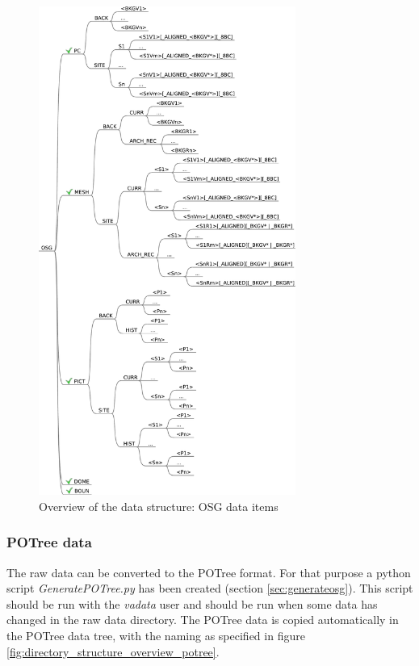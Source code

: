 \begin{figure}[!ht]
 \centering
 \includegraphics[width=0.75\textwidth]{fig/directory_structure_osg}
 \caption{Overview of the data structure: OSG data items}
 \label{fig:directory_structure_overview_osg}
\end{figure}

\subsubsection{POTree data}
The raw data can be converted to the POTree format. For that purpose a python script \textit{GeneratePOTree.py} has been created (section \ref{sec:generateosg}). This script should be run with the \textit{vadata} user and should be run when some data has changed in the raw data directory. The POTree data is copied automatically in the POTree data tree, with the naming as specified in figure \ref{fig:directory_structure_overview_potree}.

